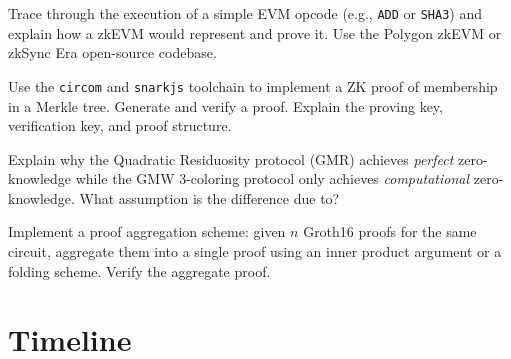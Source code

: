 \begin{exercise}[Challenge]
Trace through the execution of a simple EVM opcode (e.g., \texttt{ADD} or \texttt{SHA3}) and explain how a zkEVM would represent and prove it. Use the Polygon zkEVM or zkSync Era open-source codebase.
\end{exercise}

\begin{exercise}[Challenge]
Use the \texttt{circom} and \texttt{snarkjs} toolchain to implement a ZK proof of membership in a Merkle tree. Generate and verify a proof. Explain the proving key, verification key, and proof structure.
\end{exercise}

\begin{exercise}[Basic]
Explain why the Quadratic Residuosity protocol (GMR) achieves \emph{perfect} zero-knowledge while the GMW 3-coloring protocol only achieves \emph{computational} zero-knowledge. What assumption is the difference due to?
\end{exercise}

\begin{exercise}[Challenge]
Implement a proof aggregation scheme: given $n$ Groth16 proofs for the same circuit, aggregate them into a single proof using an inner product argument or a folding scheme. Verify the aggregate proof.
\end{exercise}

\section{Timeline}
\label{sec:zk:timeline}


